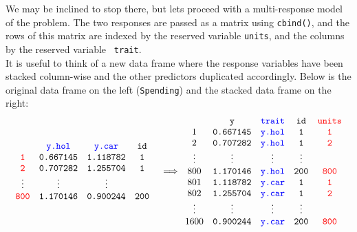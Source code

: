 \documentclass{article}
\begin{document}
 We may be inclined to stop there, but lets proceed with a multi-response model of the problem. The two responses are passed as a matrix using \texttt{cbind()}, and the rows of this matrix are indexed by the reserved variable {\color{red} \texttt{units}}, and the columns by the reserved variable \texttt{\color{blue} \texttt{trait}}.\\ 

It is useful to think of a new data frame where the response variables have been stacked column-wise and the other predictors duplicated accordingly. Below is the original data frame on the left (\texttt{Spending}) and the stacked data frame on the right:\\  

\begin{displaymath}
\begin{array}{cc}
\begin{array}{cccc}
&{\color{blue} \texttt{y.hol}}&{\color{blue} \texttt{y.car}}&\texttt{id}\\
{\color{red} \texttt{1}}&\texttt{0.667145}&\texttt{1.118782}&\texttt{1}\\
{\color{red} \texttt{2}}&\texttt{0.707282}&\texttt{1.255704}&\texttt{1}\\
\vdots&\vdots&\vdots\\
{\color{red} \texttt{800}}&\texttt{1.170146}&\texttt{0.900244}&\texttt{200}\\
\end{array}&
\Longrightarrow
\begin{array}{ccccc}
&\texttt{y}&{\color{blue} \texttt{trait}}&\texttt{id}&{\color{red} \texttt{units}}\\
1&\texttt{0.667145}&{\color{blue} \texttt{y.hol}}&\texttt{1}&{\color{red} \texttt{1}}\\
2&\texttt{0.707282}&{\color{blue} \texttt{y.hol}}&\texttt{1}&{\color{red} \texttt{2}}\\
\vdots&\vdots&\vdots&\vdots\\
800&\texttt{1.170146}&{\color{blue} \texttt{y.hol}}&\texttt{200}&{\color{red} \texttt{800}}\\
801&\texttt{1.118782}&{\color{blue} \texttt{y.car}}&\texttt{1}&{\color{red} \texttt{1}}\\
802&\texttt{1.255704}&{\color{blue} \texttt{y.car}}&\texttt{1}&{\color{red} \texttt{2}}\\
\vdots&\vdots&\vdots&\vdots\\
1600&\texttt{0.900244}&{\color{blue} \texttt{y.car}}&\texttt{200}&{\color{red} \texttt{800}}\\
\end{array}
\end{array}
\end{displaymath}
\end{document}
